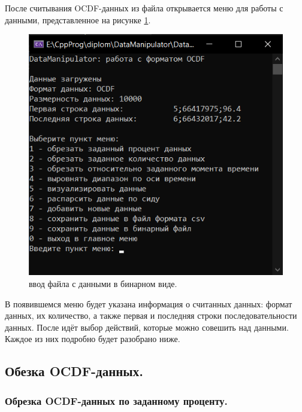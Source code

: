 {\standartFont

  \par После считывания OCDF-данных из файла открывается меню для работы с данными, представленное на рисунке \ref{fig:OCDFmenu}.

  \begin{figure}[H]
    \centering
    \includegraphics{images/OCDFmenu.png}
    \caption{ввод файла с данными в бинарном виде.} 
    \label{fig:OCDFmenu}
  \end{figure}

  \par В появившемся меню будет указана информация о считанных данных: формат данных, их количество, а также первая и последняя строки последовательности данных. После идёт выбор действий, которые можно совешить над данными. Каждое из них подробно будет разобрано ниже.

  \par
}

\subsection{ \standartTitleFont
  Обезка OCDF-данных. 
} 

\subsubsection{ \standartTitleFont
  Обрезка OCDF-данных по заданному проценту. 
} 

